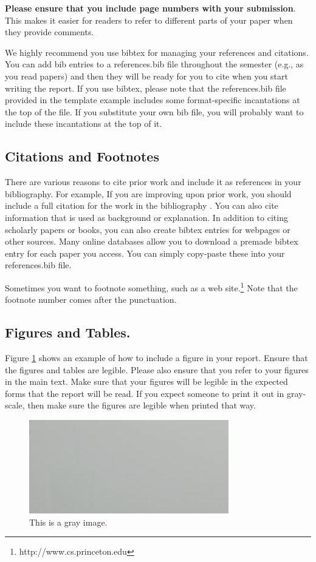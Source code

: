 \documentclass[pageno]{jpaper}
\begin{document}
\textbf{Please ensure that you include page numbers with your
submission}. This makes it easier for readers to refer to
different parts of your paper when they provide comments.

We highly recommend you use bibtex for managing your references and citations.  You can add bib entries to a references.bib file throughout the semester (e.g., as you read papers) and then they will be ready for you to cite when you start writing the report.  If you use bibtex, please note that the references.bib file provided in the template example includes some format-specific incantations at the top of the file.  If you substitute your own bib file, you will probably want to include these 
incantations at the top of it.

\subsection{Citations and Footnotes}

There are various reasons to cite prior work and include it as references in your bibliography.  For example, If you are improving upon 
prior work, you should include
a full citation for the work in the bibliography \cite{nicepaper,nicepaper2}. 
You can also cite information that is used as background or
explanation\cite{Salzberg:2005}.  In addition to citing scholarly papers or books, you can
also create bibtex entries for webpages or other sources.  Many online
databases allow you to download a premade bibtex entry for each paper
you access.  You can simply copy-paste these into your references.bib
file.

Sometimes you want to footnote something, such as a web
site.\footnote{http://www.cs.princeton.edu}  Note that the footnote
number comes after the punctuation.

\subsection{Figures and Tables.}

Figure \ref{fig:gray} shows an example of how to include a figure in
your report.  
Ensure that the figures and
tables are legible.  Please also ensure that you refer to your
figures in the main text. Make sure that your figures will be legible
in the expected forms that the report will be read.  If you expect someone
to print it out in gray-scale, then make sure the figures are legible 
when printed that way.  

\begin{figure}[hbt]
\centering
\includegraphics[width=0.75\linewidth]{gray.jpg}
\caption{This is a gray image.}
\label{fig:gray}
\end{figure}
\end{document}
